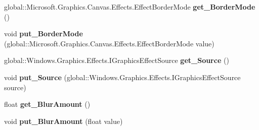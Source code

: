 \begin{DoxyCompactItemize}
\mbox{\label{interface_microsoft_1_1_graphics_1_1_canvas_1_1_effects_1_1_i_directional_blur_effect_a74efbf96cb636f056a89880c63859cd8}} 
global\+::\+Microsoft.\+Graphics.\+Canvas.\+Effects.\+Effect\+Border\+Mode {\bfseries get\+\_\+\+Border\+Mode} ()
\item 
\mbox{\label{interface_microsoft_1_1_graphics_1_1_canvas_1_1_effects_1_1_i_directional_blur_effect_a826a5452cf6d53f023b716ce8307b270}} 
void {\bfseries put\+\_\+\+Border\+Mode} (global\+::\+Microsoft.\+Graphics.\+Canvas.\+Effects.\+Effect\+Border\+Mode value)
\item 
\mbox{\label{interface_microsoft_1_1_graphics_1_1_canvas_1_1_effects_1_1_i_directional_blur_effect_a4bd130580cbba798a3932118c6be8047}} 
global\+::\+Windows.\+Graphics.\+Effects.\+I\+Graphics\+Effect\+Source {\bfseries get\+\_\+\+Source} ()
\item 
\mbox{\label{interface_microsoft_1_1_graphics_1_1_canvas_1_1_effects_1_1_i_directional_blur_effect_a2ac36071af70289687b3c9a8a77dcf46}} 
void {\bfseries put\+\_\+\+Source} (global\+::\+Windows.\+Graphics.\+Effects.\+I\+Graphics\+Effect\+Source source)
\item 
\mbox{\label{interface_microsoft_1_1_graphics_1_1_canvas_1_1_effects_1_1_i_directional_blur_effect_a4678a1fcff40d964531dcc8bec2c2623}} 
float {\bfseries get\+\_\+\+Blur\+Amount} ()
\item 
\mbox{\label{interface_microsoft_1_1_graphics_1_1_canvas_1_1_effects_1_1_i_directional_blur_effect_ab5a1c0e6691e6caf3350123e055c9cc2}} 
void {\bfseries put\+\_\+\+Blur\+Amount} (float value)
\item 
\mbox{\label{interface_microsoft_1_1_graphics_1_1_canvas_1_1_effects_1_1_i_directional_blur_effect_ad5925e9f76f210acd008a4877fb9e527}} 

\end{DoxyCompactItemize}
